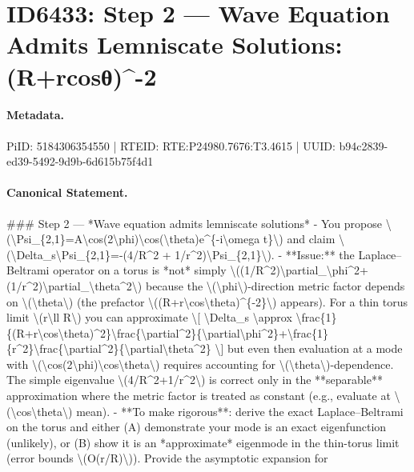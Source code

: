 \section*{ID6433: Step 2 — Wave Equation Admits Lemniscate Solutions: (R+rcosθ)\textasciicircum{}-2}
\paragraph{Metadata.}
PiID: 5184306354550 | RTEID: RTE:P24980.7676:T3.4615 | UUID: b94c2839-ed39-5492-9d9b-6d615b75f4d1

\paragraph{Canonical Statement.}
\#\#\# Step 2 — *Wave equation admits lemniscate solutions* - You propose \textbackslash{}(\textbackslash{}Psi\_\{2,1\}=A\textbackslash{}cos(2\textbackslash{}phi)\textbackslash{}cos(\textbackslash{}theta)e\textasciicircum{}\{-i\textbackslash{}omega t\}\textbackslash{}) and claim \textbackslash{}(\textbackslash{}Delta\_s\textbackslash{}Psi\_\{2,1\}=-(4/R\textasciicircum{}2 + 1/r\textasciicircum{}2)\textbackslash{}Psi\_\{2,1\}\textbackslash{}). - **Issue:** the Laplace–Beltrami operator on a torus is *not* simply \textbackslash{}((1/R\textasciicircum{}2)\textbackslash{}partial\_\textbackslash{}phi\textasciicircum{}2+(1/r\textasciicircum{}2)\textbackslash{}partial\_\textbackslash{}theta\textasciicircum{}2\textbackslash{}) because the \textbackslash{}(\textbackslash{}phi\textbackslash{})-direction metric factor depends on \textbackslash{}(\textbackslash{}theta\textbackslash{}) (the prefactor \textbackslash{}((R+r\textbackslash{}cos\textbackslash{}theta)\textasciicircum{}\{-2\}\textbackslash{}) appears). For a thin torus limit \textbackslash{}(r\textbackslash{}ll R\textbackslash{}) you can approximate \textbackslash{}[ \textbackslash{}Delta\_s \textbackslash{}approx \textbackslash{}frac\{1\}\{(R+r\textbackslash{}cos\textbackslash{}theta)\textasciicircum{}2\}\textbackslash{}frac\{\textbackslash{}partial\textasciicircum{}2\}\{\textbackslash{}partial\textbackslash{}phi\textasciicircum{}2\}+\textbackslash{}frac\{1\}\{r\textasciicircum{}2\}\textbackslash{}frac\{\textbackslash{}partial\textasciicircum{}2\}\{\textbackslash{}partial\textbackslash{}theta\textasciicircum{}2\} \textbackslash{}] but even then evaluation at a mode with \textbackslash{}(\textbackslash{}cos(2\textbackslash{}phi)\textbackslash{}cos\textbackslash{}theta\textbackslash{}) requires accounting for \textbackslash{}(\textbackslash{}theta\textbackslash{})-dependence. The simple eigenvalue \textbackslash{}(4/R\textasciicircum{}2+1/r\textasciicircum{}2\textbackslash{}) is correct only in the **separable** approximation where the metric factor is treated as constant (e.g., evaluate at \textbackslash{}(\textbackslash{}cos\textbackslash{}theta\textbackslash{}) mean). - **To make rigorous**: derive the exact Laplace–Beltrami on the torus and either (A) demonstrate your mode is an exact eigenfunction (unlikely), or (B) show it is an *approximate* eigenmode in the thin-torus limit (error bounds \textbackslash{}(O(r/R)\textbackslash{})). Provide the asymptotic expansion for 